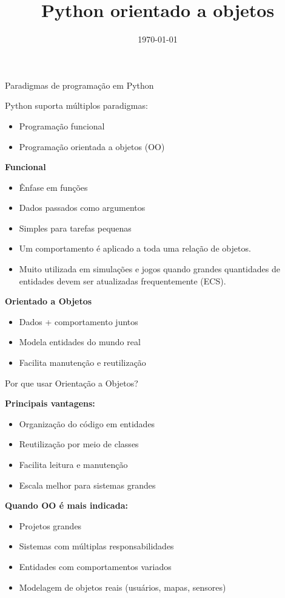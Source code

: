 \documentclass{beamer}
\title{Python orientado a objetos}
\date{\today}
\begin{document}
  


\begin{frame}{Paradigmas de programação em Python}
  
  Python suporta múltiplos paradigmas:
  \begin{itemize}
    \item Programação funcional
    \item Programação orientada a objetos (OO)
  \end{itemize}
  
  \vspace{0.3cm}
  
  \textbf{Funcional}
  \begin{itemize}
    \item Ênfase em funções
    \item Dados passados como argumentos
    \item Simples para tarefas pequenas
    \item Um comportamento é aplicado a toda uma relação de objetos.
    \item Muito utilizada em simulações e jogos quando grandes quantidades de entidades devem ser atualizadas frequentemente (ECS). 
  \end{itemize}
  
  \vspace{0.2cm}
  
  \textbf{Orientado a Objetos}
  \begin{itemize}
    \item Dados + comportamento juntos
    \item Modela entidades do mundo real
    \item Facilita manutenção e reutilização
  \end{itemize}
  
\end{frame}

\begin{frame}{Por que usar Orientação a Objetos?}
  
  \textbf{Principais vantagens:}
  \begin{itemize}
    \item Organização do código em entidades
    \item Reutilização por meio de classes
    \item Facilita leitura e manutenção
    \item Escala melhor para sistemas grandes
  \end{itemize}
  
  \vspace{0.3cm}
  
  \textbf{Quando OO é mais indicada:}
  \begin{itemize}
    \item Projetos grandes
    \item Sistemas com múltiplas responsabilidades
    \item Entidades com comportamentos variados
    \item Modelagem de objetos reais (usuários, mapas, sensores)
  \end{itemize}
  
\end{frame}
\end{document}
